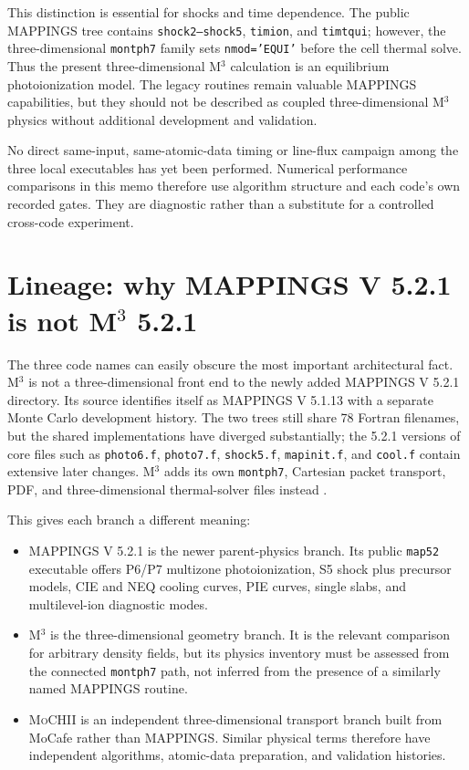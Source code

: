 \documentclass[english,a4paper]{my_memo}
\newcommand{\code}[1]{\texttt{#1}}
\newcommand{\MoCHII}{\textsc{MoCHII}}
\newcommand{\Mthree}{M$^3$}
\newcommand{\Mappings}{MAPPINGS V 5.2.1}
\begin{document}
This distinction is essential for shocks and time dependence.  The public
MAPPINGS tree contains \code{shock2--shock5}, \code{timion}, and
\code{timtqui}; however, the three-dimensional \code{montph7} family sets
\code{nmod='EQUI'} before the cell thermal solve.  Thus the present
three-dimensional \Mthree{} calculation is an equilibrium photoionization
model.  The legacy routines remain valuable MAPPINGS capabilities, but
they should not be described as coupled three-dimensional \Mthree{}
physics without additional development and validation.

No direct same-input, same-atomic-data timing or line-flux campaign among
the three local executables has yet been performed.  Numerical performance
comparisons in this memo therefore use algorithm structure and each code's
own recorded gates.  They are diagnostic rather than a substitute for a
controlled cross-code experiment.

\section{Lineage: why MAPPINGS V 5.2.1 is not
\texorpdfstring{M$^3$}{M3} 5.2.1}

The three code names can easily obscure the most important architectural
fact.  \Mthree{} is not a three-dimensional front end to the newly added
\Mappings{} directory.  Its source identifies itself as MAPPINGS V
5.1.13 with a separate Monte Carlo development history.  The two trees
still share 78 Fortran filenames, but the shared implementations have
diverged substantially; the 5.2.1 versions of core files such as
\code{photo6.f}, \code{photo7.f}, \code{shock5.f}, \code{mapinit.f}, and
\code{cool.f} contain extensive later changes.  \Mthree{} adds its own
\code{montph7}, Cartesian packet transport, PDF, and three-dimensional
thermal-solver files instead \cite{jin2022,mappings521}.

This gives each branch a different meaning:

\begin{itemize}[leftmargin=2em]
\item \Mappings{} is the newer parent-physics branch.  Its public
  \code{map52} executable offers P6/P7 multizone photoionization, S5
  shock plus precursor models, CIE and NEQ cooling curves, PIE curves,
  single slabs, and multilevel-ion diagnostic modes.
\item \Mthree{} is the three-dimensional geometry branch.  It is the
  relevant comparison for arbitrary density fields, but its physics
  inventory must be assessed from the connected \code{montph7} path,
  not inferred from the presence of a similarly named MAPPINGS routine.
\item \MoCHII{} is an independent three-dimensional transport branch built
  from MoCafe rather than MAPPINGS.  Similar physical terms therefore have
  independent algorithms, atomic-data preparation, and validation histories.
\end{itemize}
\end{document}
